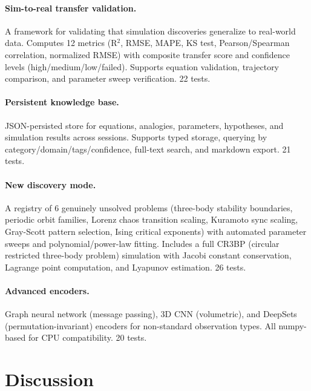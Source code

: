 \documentclass{article}
\begin{document}
\paragraph{Sim-to-real transfer validation.}
A framework for validating that simulation discoveries generalize to real-world
data. Computes 12 metrics (R$^2$, RMSE, MAPE, KS test, Pearson/Spearman
correlation, normalized RMSE) with composite transfer score and confidence
levels (high/medium/low/failed). Supports equation validation, trajectory
comparison, and parameter sweep verification. 22 tests.

\paragraph{Persistent knowledge base.}
JSON-persisted store for equations, analogies, parameters, hypotheses, and
simulation results across sessions. Supports typed storage, querying by
category/domain/tags/confidence, full-text search, and markdown export.
21 tests.

\paragraph{New discovery mode.}
A registry of 6 genuinely unsolved problems (three-body stability boundaries,
periodic orbit families, Lorenz chaos transition scaling, Kuramoto sync scaling,
Gray-Scott pattern selection, Ising critical exponents) with automated
parameter sweeps and polynomial/power-law fitting. Includes a full CR3BP
(circular restricted three-body problem) simulation with Jacobi constant
conservation, Lagrange point computation, and Lyapunov estimation.
26 tests.

\paragraph{Advanced encoders.}
Graph neural network (message passing), 3D CNN (volumetric), and
DeepSets (permutation-invariant) encoders for non-standard observation
types. All numpy-based for CPU compatibility. 20 tests.

\section{Discussion}
\label{sec:discussion}
\end{document}
